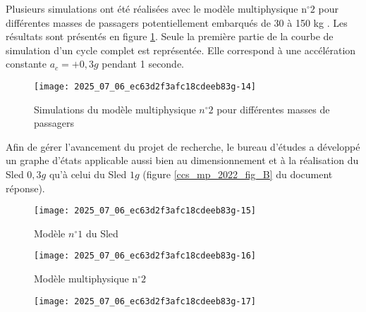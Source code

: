 Plusieurs simulations ont été réalisées avec le modèle multiphysique $\mathrm{n}^{\circ} 2$ pour différentes masses de passagers potentiellement embarqués de 30 à 150 kg . Les résultats sont présentés en figure \ref{ccs_mp_2022_fig_19}. Seule la première partie de la courbe de simulation d'un cycle complet est représentée. Elle correspond à une accélération constante $a_{c}=+0,3 g$ pendant 1 seconde.

\begin{figure}[!h]
\centering
\texttt{[image: 2025\_07\_06\_ec63d2f3afc18cdeeb83g-14]}

\caption{\label{ccs_mp_2022_fig_19}Simulations du modèle multiphysique $n^{\circ} 2$ pour différentes masses de passagers}
\end{figure}


Afin de gérer l'avancement du projet de recherche, le bureau d'études a développé un graphe d'états applicable aussi bien au dimensionnement et à la réalisation du Sled $0,3 g$ qu'à celui du Sled $1 g$ (figure \ref{ccs_mp_2022_fig_B} du document réponse).


\begin{figure}[!h]
\centering

\texttt{[image: 2025\_07\_06\_ec63d2f3afc18cdeeb83g-15]}
\caption{\label{ccs_mp_2022_fig_20}Modèle $n^{\circ} 1$ du Sled}
\end{figure}


\begin{figure}[!h]
\centering
\texttt{[image: 2025\_07\_06\_ec63d2f3afc18cdeeb83g-16]}

\caption{\label{ccs_mp_2022_fig_21}Modèle multiphysique $\mathrm{n}^{\circ} 2$}
\end{figure}


\begin{figure}[!h]
\centering

\texttt{[image: 2025\_07\_06\_ec63d2f3afc18cdeeb83g-17]}
\end{figure}

